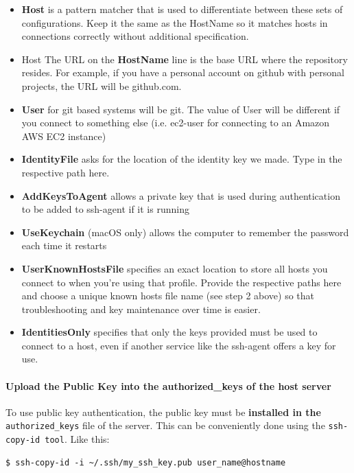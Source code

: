\documentclass{article}
\newenvironment{codetemplate}[1][]{%
  \mybasecolorbox[#1]
  \itshape
}{%
  \endmybasecolorbox
}
\begin{document}
\begin{itemize}
    \item \textbf{Host} is a pattern matcher that is used to differentiate between these sets of configurations. Keep it the same as the HostName so it matches hosts in connections correctly without additional specification.
    \item Host The URL on the \textbf{HostName} line is the base URL where the repository resides. For example, if you have a personal account on github with personal projects, the URL will be github.com.
    \item \textbf{User} for git based systems will be git. The value of User will be different if you connect to something else (i.e. ec2-user for connecting to an Amazon AWS EC2 instance)
    \item \textbf{IdentityFile} asks for the location of the identity key we made. Type in the respective path here.
    \item \textbf{AddKeysToAgent} allows a private key that is used during authentication to be added to ssh-agent if it is running
    \item \textbf{UseKeychain} (macOS only) allows the computer to remember the password each time it restarts
    \item \textbf{UserKnownHostsFile} specifies an exact location to store all hosts you connect to when you're using that profile. Provide the respective paths here and choose a unique known hosts file name (see step 2 above) so that troubleshooting and key maintenance over time is easier.
    \item \textbf{IdentitiesOnly} specifies that only the keys provided must be used to connect to a host, even if another service like the ssh-agent offers a key for use.
\end{itemize}




\paragraph{Upload the Public Key into the authorized\_keys of the host server}
To use public key authentication, the public key must be \textbf{installed in the} \verb|authorized_keys| file of the server. This can be conveniently done using the \verb|ssh-copy-id tool|. Like this:

\begin{codetemplate}{}
\begin{verbatim}
$ ssh-copy-id -i ~/.ssh/my_ssh_key.pub user_name@hostname
\end{verbatim}
\end{codetemplate}
\end{document}
